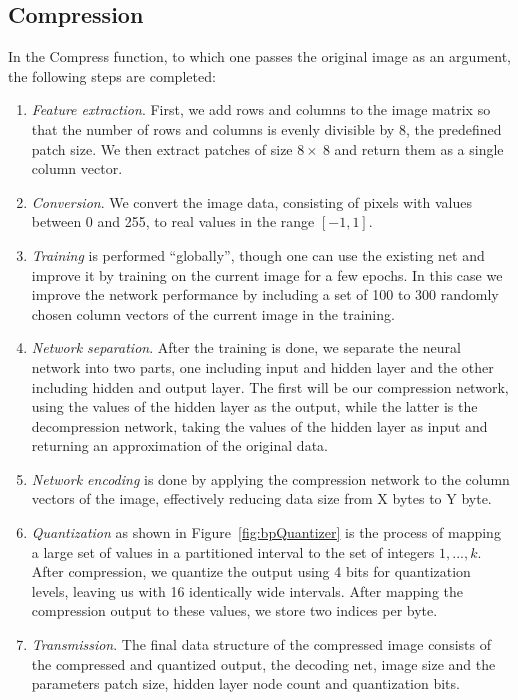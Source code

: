 \subsection{Compression} \label{sec:compress}
In the Compress function, to which one passes the original image as an argument, the following steps are completed:
\begin{enumerate}
\item \emph{Feature extraction}. First, we add rows and columns to the image matrix so that the number of rows and columns is evenly divisible by 8, the predefined patch size. We then extract patches of size \(8 \times~8\) and return them as a single column vector.

\item \emph{Conversion}. We convert the image data, consisting of pixels with values between 0 and 255, to real values in the range \([-1, 1]\). 

\item \emph{Training} is performed ``globally'', though one can use the existing net and improve it by training on the current image for a few epochs. In this case we improve the network performance by including a set of 100 to 300 randomly chosen column vectors of the current image in the training.

\item \emph{Network separation}. After the training is done, we separate the neural network into two parts, one including input and hidden layer and the other including hidden and output layer. The first will be our compression network, using the values of the hidden layer as the output, while the latter is the decompression network, taking the values of the hidden layer as input and returning an approximation of the original data.

\item \emph{Network encoding} is done by applying the compression network to the column vectors of the image, effectively reducing data size from {\color{red} X bytes to Y byte}.

\item \emph{Quantization} as shown in Figure~\ref{fig:bpQuantizer} is the process of mapping a large set of values in a partitioned interval to the set of integers \({1,...,k}\). After compression, we quantize the output using 4 bits for quantization levels, leaving us with 16 identically wide intervals. After mapping the compression output to these values, we store two indices per byte.

\item \emph{Transmission}. The final data structure of the compressed image consists of the compressed and quantized output, the decoding net, image size and the parameters patch size, hidden layer node count and quantization bits.
\end{enumerate}

